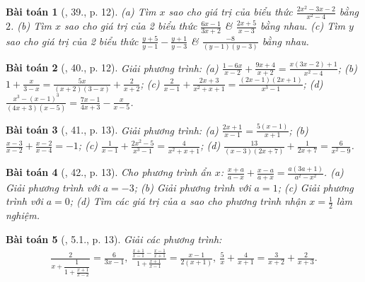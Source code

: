 \documentclass{article}
\newtheorem{baitoan}{Bài toán}
\begin{document}
\begin{baitoan}[\cite{SBT_Toan_8_tap_2}, 39., p. 12]
	(a) Tìm $x$ sao cho giá trị của biểu thức $\frac{2x^2 - 3x - 2}{x^2 - 4}$ bằng $2$. (b) Tìm $x$ sao cho giá trị của 2 biểu thức $\frac{6x - 1}{3x + 2}$ \& $\frac{2x + 5}{x - 3}$ bằng nhau. (c) Tìm $y$ sao cho giá trị của 2 biểu thức $\frac{y + 5}{y - 1} - \frac{y + 1}{y - 3}$ \& $\frac{-8}{(y - 1)(y - 3)}$ bằng nhau.
\end{baitoan}

\begin{baitoan}[\cite{SBT_Toan_8_tap_2}, 40., p. 12]
	Giải phương trình: (a) $\frac{1 - 6x}{x - 2} + \frac{9x + 4}{x + 2} = \frac{x(3x - 2) + 1}{x^2 - 4}$; (b) $1 + \frac{x}{3 - x} = \frac{5x}{(x + 2)(3 - x)} + \frac{2}{x + 2}$; (c) $\frac{2}{x - 1} + \frac{2x + 3}{x^2 + x + 1} = \frac{(2x - 1)(2x + 1)}{x^3 - 1}$; (d) $\frac{x^3 - (x - 1)^3}{(4x + 3)(x - 5)} = \frac{7x - 1}{4x + 3} - \frac{x}{x - 5}$.
\end{baitoan}

\begin{baitoan}[\cite{SBT_Toan_8_tap_2}, 41., p. 13]
	Giải phương trình: (a) $\frac{2x + 1}{x - 1} = \frac{5(x - 1)}{x + 1}$; (b) $\frac{x - 3}{x - 2} + \frac{x - 2}{x - 4} = - 1$; (c) $\frac{1}{x - 1} + \frac{2x^2 - 5}{x^3 - 1} = \frac{4}{x^2 + x + 1}$; (d) $\frac{13}{(x - 3)(2x + 7)} + \frac{1}{2x + 7} = \frac{6}{x^2 - 9}$.
\end{baitoan}

\begin{baitoan}[\cite{SBT_Toan_8_tap_2}, 42., p. 13]
	Cho phương trình ẩn $x$: $\frac{x + a}{a - x} + \frac{x - a}{a + x} = \frac{a(3a + 1)}{a^2 - x^2}$. (a) Giải phương trình với $a = -3$; (b) Giải phương trình với $a = 1$; (c) Giải phương trình với $a = 0$; (d) Tìm các giá trị của $a$ sao cho phương trình nhận $x = \frac{1}{2}$ làm nghiệm.
\end{baitoan}

\begin{baitoan}[\cite{SBT_Toan_8_tap_2}, 5.1., p. 13]
	Giải các phương trình:
	\begin{align*}
		\frac{2}{x + \dfrac{1}{1 + \frac{x + 1}{x - 2}}} = \frac{6}{3x - 1},\ \frac{\frac{x + 1}{x - 1} - \frac{x - 1}{x + 1}}{1 + \frac{x + 1}{x - 1}} = \frac{x - 1}{2(x + 1)},\ \frac{5}{x} + \frac{4}{x + 1} = \frac{3}{x + 2} + \frac{2}{x + 3}.
	\end{align*}
\end{baitoan}

\end{document}
